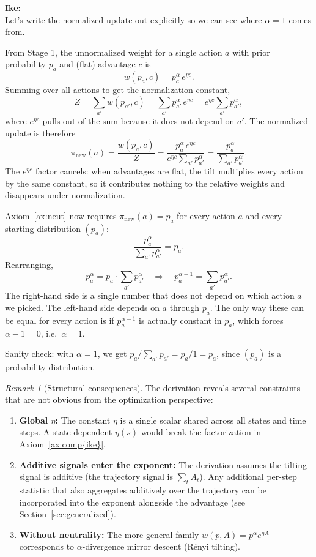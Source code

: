 \documentclass[11pt]{article}
\theoremstyle{definition}
\theoremstyle{remark}
\newtheorem{remark}[theorem]{Remark}
\newenvironment{ike}{\color{blue}\textbf{Ike:}\\}{}
\begin{document}
\begin{ike}
Let's write the normalized update out explicitly so we can see where $\alpha = 1$ comes from.

From Stage 1, the unnormalized weight for a single action $a$ with prior probability $p_a$ and (flat) advantage $c$ is
\[
w(p_a, c) = p_a^\alpha \, e^{\eta c}.
\]
Summing over all actions to get the normalization constant,
\[
Z = \sum_{a'} w(p_{a'}, c) = \sum_{a'} p_{a'}^\alpha \, e^{\eta c} = e^{\eta c} \sum_{a'} p_{a'}^\alpha,
\]
where $e^{\eta c}$ pulls out of the sum because it does not depend on $a'$. The normalized update is therefore
\[
\pi_{\text{new}}(a) = \frac{w(p_a, c)}{Z} = \frac{p_a^\alpha \, e^{\eta c}}{e^{\eta c} \sum_{a'} p_{a'}^\alpha} = \frac{p_a^\alpha}{\sum_{a'} p_{a'}^\alpha}.
\]
The $e^{\eta c}$ factor cancels: when advantages are flat, the tilt multiplies every action by the same constant, so it contributes nothing to the relative weights and disappears under normalization.

Axiom~\ref{ax:neut} now requires $\pi_{\text{new}}(a) = p_a$ for every action $a$ and every starting distribution $(p_a)$:
\[
\frac{p_a^\alpha}{\sum_{a'} p_{a'}^\alpha} = p_a.
\]
Rearranging,
\[
p_a^\alpha = p_a \cdot \sum_{a'} p_{a'}^\alpha \quad\Longrightarrow\quad p_a^{\alpha - 1} = \sum_{a'} p_{a'}^\alpha.
\]
The right-hand side is a single number that does not depend on which action $a$ we picked. The left-hand side depends on $a$ through $p_a$. The only way these can be equal for every action is if $p_a^{\alpha - 1}$ is actually constant in $p_a$, which forces $\alpha - 1 = 0$, i.e.\ $\alpha = 1$.

Sanity check: with $\alpha = 1$, we get $p_a / \sum_{a'} p_{a'} = p_a / 1 = p_a$, since $(p_a)$ is a probability distribution.
\end{ike}

\begin{remark}[Structural consequences]
The derivation reveals several constraints that are not obvious from the optimization perspective:
\begin{enumerate}[label=(\roman*)]
  \item \textbf{Global $\eta$:} The constant $\eta$ is a single scalar shared across all states and time steps. A state-dependent $\eta(s)$ would break the factorization in Axiom~\ref{ax:comp{ike}}.
  \item \textbf{Additive signals enter the exponent:} The derivation assumes the tilting signal is additive (the trajectory signal is $\sum_t A_t$). Any additional per-step statistic that also aggregates additively over the trajectory can be incorporated into the exponent alongside the advantage (see Section~\ref{sec:generalized}).
  \item \textbf{Without neutrality:} The more general family $w(p,A) = p^\alpha e^{\eta A}$ corresponds to $\alpha$-divergence mirror descent (R\'enyi tilting).
\end{enumerate}
\end{remark}
\end{document}
